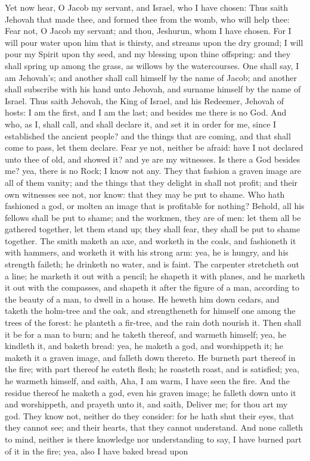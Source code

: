 Yet now hear, O Jacob my servant, and Israel, who I have chosen: Thus saith Jehovah that made thee, and formed thee from the womb, who will help thee: Fear not, O Jacob my servant; and thou, Jeshurun, whom I have chosen. For I will pour water upon him that is thirsty, and streams upon the dry ground; I will pour my Spirit upon thy seed, and my blessing upon thine offspring: and they shall spring up among the grass, as willows by the watercourses. One shall say, I am Jehovah’s; and another shall call himself by the name of Jacob; and another shall subscribe with his hand unto Jehovah, and surname himself by the name of Israel.  Thus saith Jehovah, the King of Israel, and his Redeemer, Jehovah of hosts: I am the first, and I am the last; and besides me there is no God. And who, as I, shall call, and shall declare it, and set it in order for me, since I established the ancient people? and the things that are coming, and that shall come to pass, let them declare. Fear ye not, neither be afraid: have I not declared unto thee of old, and showed it? and ye are my witnesses. Is there a God besides me? yea, there is no Rock; I know not any.  They that fashion a graven image are all of them vanity; and the things that they delight in shall not profit; and their own witnesses see not, nor know: that they may be put to shame. Who hath fashioned a god, or molten an image that is profitable for nothing? Behold, all his fellows shall be put to shame; and the workmen, they are of men: let them all be gathered together, let them stand up; they shall fear, they shall be put to shame together.  The smith maketh an axe, and worketh in the coals, and fashioneth it with hammers, and worketh it with his strong arm: yea, he is hungry, and his strength faileth; he drinketh no water, and is faint. The carpenter stretcheth out a line; he marketh it out with a pencil; he shapeth it with planes, and he marketh it out with the compasses, and shapeth it after the figure of a man, according to the beauty of a man, to dwell in a house. He heweth him down cedars, and taketh the holm-tree and the oak, and strengtheneth for himself one among the trees of the forest: he planteth a fir-tree, and the rain doth nourish it. Then shall it be for a man to burn; and he taketh thereof, and warmeth himself; yea, he kindleth it, and baketh bread: yea, he maketh a god, and worshippeth it; he maketh it a graven image, and falleth down thereto. He burneth part thereof in the fire; with part thereof he eateth flesh; he roasteth roast, and is satisfied; yea, he warmeth himself, and saith, Aha, I am warm, I have seen the fire. And the residue thereof he maketh a god, even his graven image; he falleth down unto it and worshippeth, and prayeth unto it, and saith, Deliver me; for thou art my god.  They know not, neither do they consider: for he hath shut their eyes, that they cannot see; and their hearts, that they cannot understand. And none calleth to mind, neither is there knowledge nor understanding to say, I have burned part of it in the fire; yea, also I have baked bread upon 